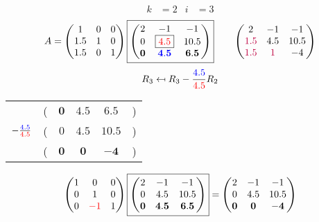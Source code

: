 \documentclass[pdf]{beamer}
\begin{document}
\begin{frame}{}\begin{align*} k &= 2 & i &= 3 \end{align*} $$A=\begin{pmatrix}1&0&0\\1.5&1&0\\1.5&0&1\end{pmatrix} \boxed{\begin{pmatrix}2&-1&-1\\0&\boxed{{\color{red}4.5}}&10.5\\\mathbf{0}&\mathbf{{\color{blue}4.5}}&\mathbf{6.5}\end{pmatrix}} \quad\quad \begin{pmatrix}2&-1&-1\\{\color{purple}1.5}&4.5&10.5\\{\color{purple}1.5}&{\color{purple}1}&-4\end{pmatrix}$$ $$R_3 \mapsfrom R_3 - \frac{{\color{blue}4.5}}{{\color{red}4.5}} R_2$$ \begin{center}\begin{tabular}{cccccc}  &(& $ \mathbf{0} $ & $ \mathbf{4.5} $ & $ \mathbf{6.5} $ &)\\$ -\frac{{\color{blue}4.5}}{{\color{red}4.5}} $&(& $ 0 $ & $ 4.5 $ & $ 10.5 $ &)\\\hline  &(& $ \mathbf{0} $ & $ \mathbf{0} $ & $ \mathbf{-4} $ &) \end{tabular}\end{center} $$ \begin{pmatrix}1&0&0\\0&1&0\\0&{\color{red}-1}&1\end{pmatrix} \boxed{\begin{pmatrix}2&-1&-1\\0&4.5&10.5\\\mathbf{0}&\mathbf{4.5}&\mathbf{6.5}\end{pmatrix}} = \begin{pmatrix}2&-1&-1\\0&4.5&10.5\\\mathbf{0}&\mathbf{0}&\mathbf{-4}\end{pmatrix} $$\end{frame}
\end{document}
